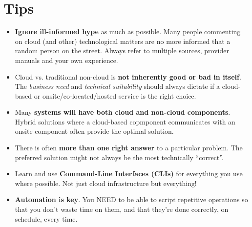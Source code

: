 \documentclass{pgnotes}
\begin{document}
\section{Tips}
\label{sec:tips}

\begin{itemize}
\item \textbf{Ignore ill-informed hype} as much as possible.
  Many people commenting on cloud (and other) technological matters are no more informed that a random person on the street.
  Always refer to multiple sources, provider manuals and your own experience.
\item Cloud vs. traditional non-cloud is \textbf{not inherently good or bad in itself}.
  The \textit{business need} and \textit{technical suitability} should always dictate if a cloud-based or onsite/co-located/hosted service is the right choice.
\item Many \textbf{systems will have both cloud and non-cloud components}.
  Hybrid solutions where a cloud-based copmponent communicates with an onsite component often provide the optimal solution.
\item There is often \textbf{more than one right answer} to a particular problem.
  The preferred solution might not always be the most technically ``correct''.
\item Learn and use \textbf{Command-Line Interfaces (CLIs)} for everything you use where possible.
  Not just cloud infrastructure but everything!
\item \textbf{Automation is key}.
  You NEED to be able to script repetitive operations so that you don't waste time on them, and that they're done correctly, on schedule, every time.
\end{itemize}
\end{document}
